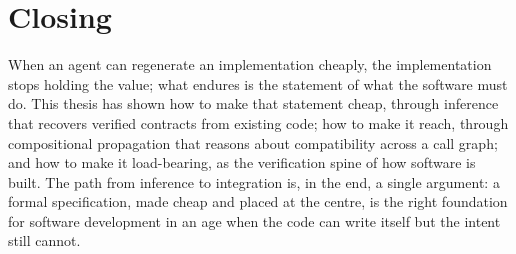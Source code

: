 \section{Closing}\label{sec:conc-closing}

When an agent can regenerate an implementation cheaply, the implementation stops
holding the value; what endures is the statement of what the software must do. This
thesis has shown how to make that statement cheap, through inference that recovers
verified contracts from existing code; how to make it reach, through compositional
propagation that reasons about compatibility across a call graph; and how to make
it load-bearing, as the verification spine of how software is built. The path from
inference to integration is, in the end, a single argument: a formal specification,
made cheap and placed at the centre, is the right foundation for software
development in an age when the code can write itself but the intent still cannot.
